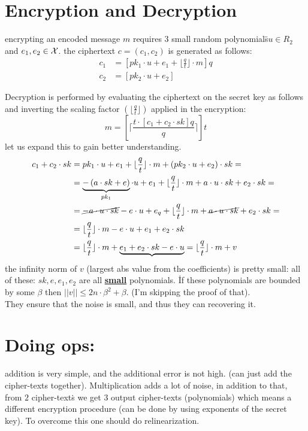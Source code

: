 \section{Encryption and Decryption }

encrypting an encoded message $m$ requires $3$ small random polynomials\"{ }$u\in R_{2}$
and $e_{1},e_{2}\in\mathcal{X}$. the ciphertext $c=\left(c_{1},c_{2}\right)$
is generated as follows:
\begin{align*}
c_{1} & =\left[pk_{1}\cdot u+e_{1}+\lfloor\frac{q}{t}\rfloor\cdot m\right]q\\
c_{2} & =\left[pk_{2}\cdot u+e_{2}\right]
\end{align*}

Decryption is performed by evaluating the ciphertext on the secret
key as follows and inverting the scaling factor $\left(\lfloor\frac{q}{t}\rfloor\right)$
applied in the encryption:
\[
m=\left[\lceil\frac{t\cdot\left[c_{1}+c_{2}\cdot sk\right]q}{q}\rceil\right]t
\]
 let us expand this to gain better understanding.
\begin{align*}
c_{1}+c_{2}\cdot sk & =pk_{1}\cdot u+e_{1}+\lfloor\frac{q}{t}\rfloor\cdot m+\left(pk_{2}\cdot u+e_{2}\right)\cdot sk=\\
 & =\underbrace{-\left(a\cdot sk+e\right)}_{pk_{1}}\cdot u+e_{1}+\lfloor\frac{q}{t}\rfloor\cdot m+a\cdot u\cdot sk+e_{2}\cdot sk=\\
 & =\cancel{-a\cdot u\cdot sk}-e\cdot u+e_{q}+\lfloor\frac{q}{t}\rfloor\cdot m+\cancel{a\cdot u\cdot sk}+e_{2}\cdot sk=\\
 & =\lfloor\frac{q}{t}\rfloor\cdot m-e\cdot u+e_{1}+e_{2}\cdot sk\\
 & =\lfloor\frac{q}{t}\rfloor\cdot m+\underbrace{e_{1}+e_{2}\cdot sk-e\cdot u}=\lfloor\frac{q}{t}\rfloor\cdot m+v
\end{align*}
 the infinity norm of $v$ (largest abs value from the coefficients)
is pretty small: all of these: $sk,e,e_{1},e_{2}$ are all \textbf{\uline{small}}
polynomials. \.{I}f these polynomials are bounded by some $\beta$
then $\left|\left|v\right|\right|\le2n\cdot\beta^{2}+\beta$. (I'm
skipping the proof of that). \\
They ensure that the noise is small, and thus they can recovering
it.

\section{Doing ops:}

addition is very simple, and the additional error is not high. (can
just add the cipher-texts together). Multiplication adds a lot of
noise, in addition to that, from $2$ cipher-text\.{s} we get $3$
output cipher-texts (polynomials) which means a different encryption
procedure (can be done by using exponents of the secret key). To overcome
this one should do relinearization. 

